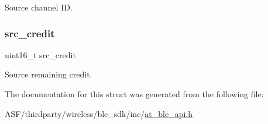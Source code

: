 Source channel ID. 

\mbox{\label{structat__ble__lecb__data__recv__t_a5e6b53fc6ab3be34fa0432c99ee05905}} 
\subsubsection{\texorpdfstring{src\_credit}{src\_credit}}
{\footnotesize\ttfamily uint16\+\_\+t src\+\_\+credit}



Source remaining credit. 



The documentation for this struct was generated from the following file\+:\begin{DoxyCompactItemize}
\item 
A\+S\+F/thirdparty/wireless/ble\+\_\+sdk/inc/\mbox{\hyperlink{at__ble__api_8h}{at\+\_\+ble\+\_\+api.\+h}}\end{DoxyCompactItemize}
